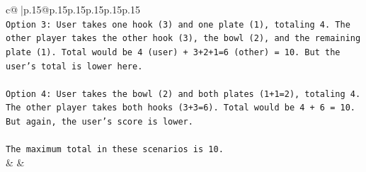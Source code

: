\documentclass{article}
\begin{document}
{\begin{supertabular}{c@{$\;$}|p{.15\linewidth}@{}p{.15\linewidth}p{.15\linewidth}p{.15\linewidth}p{.15\linewidth}p{.15\linewidth}}
{{{\\ 
\texttt{Option 3: User takes one hook (3) and one plate (1), totaling 4. The other player takes the other hook (3), the bowl (2), and the remaining plate (1). Total would be 4 (user) + 3+2+1=6 (other) = 10. But the user's total is lower here.} \\
\\ 
\texttt{Option 4: User takes the bowl (2) and both plates (1+1=2), totaling 4. The other player takes both hooks (3+3=6). Total would be 4 + 6 = 10. But again, the user's score is lower.} \\
\\ 
\texttt{The maximum total in these scenarios is 10.} \\
            }
        }
    }
    & & \\ \\


\end{supertabular}}
\end{document}

